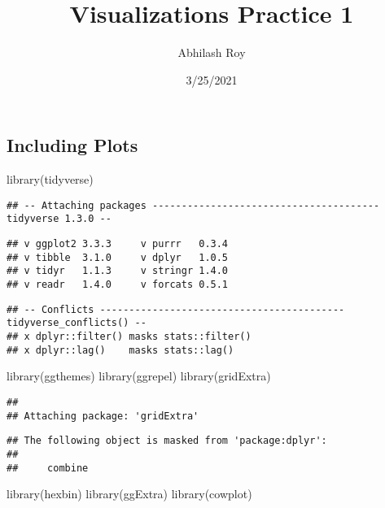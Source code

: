 \documentclass[
]{article}
\title{Visualizations Practice 1}
\author{Abhilash Roy}
\date{3/25/2021}
\newenvironment{Shaded}{\begin{snugshade}}{\end{snugshade}}
\newcommand{\FunctionTok}[1]{\textcolor[rgb]{0.00,0.00,0.00}{#1}}
\newcommand{\NormalTok}[1]{#1}
\begin{document}
\maketitle

\hypertarget{including-plots}{%
\subsection{Including Plots}\label{including-plots}}

\begin{Shaded}
\begin{Highlighting}[]
\FunctionTok{library}\NormalTok{(tidyverse) }
\end{Highlighting}
\end{Shaded}

\begin{verbatim}
## -- Attaching packages --------------------------------------- tidyverse 1.3.0 --
\end{verbatim}

\begin{verbatim}
## v ggplot2 3.3.3     v purrr   0.3.4
## v tibble  3.1.0     v dplyr   1.0.5
## v tidyr   1.1.3     v stringr 1.4.0
## v readr   1.4.0     v forcats 0.5.1
\end{verbatim}

\begin{verbatim}
## -- Conflicts ------------------------------------------ tidyverse_conflicts() --
## x dplyr::filter() masks stats::filter()
## x dplyr::lag()    masks stats::lag()
\end{verbatim}

\begin{Shaded}
\begin{Highlighting}[]
\FunctionTok{library}\NormalTok{(ggthemes)}
\FunctionTok{library}\NormalTok{(ggrepel)}
\FunctionTok{library}\NormalTok{(gridExtra)}
\end{Highlighting}
\end{Shaded}

\begin{verbatim}
## 
## Attaching package: 'gridExtra'
\end{verbatim}

\begin{verbatim}
## The following object is masked from 'package:dplyr':
## 
##     combine
\end{verbatim}

\begin{Shaded}
\begin{Highlighting}[]
\FunctionTok{library}\NormalTok{(hexbin)}
\FunctionTok{library}\NormalTok{(ggExtra)}
\FunctionTok{library}\NormalTok{(cowplot)}
\end{Highlighting}
\end{Shaded}
\end{document}
